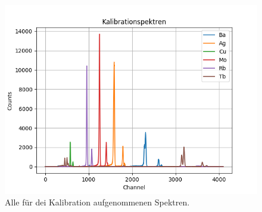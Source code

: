 \documentclass[12pt,a4paper]{article}
\begin{document}
\begin{figure}
\centering
\includegraphics[scale=0.9]{Bilder/alpha/kal_alles.png}
\caption{Alle für dei Kalibration aufgenommenen Spektren.}
\label{fig:kal_alles}
\end{figure}
\end{document}
